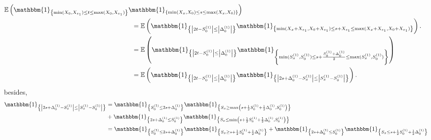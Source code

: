 \documentclass[12pt]{article}
\theoremstyle{Theorem}
\begin{document}
{\small
\begin{align*}
\mathbb{E}\left(\mathbbm{1}_{\left\{\min(X_{\scriptscriptstyle 0}, X_{e_1}) \leq t \leq \max(X_{\scriptscriptstyle 0}, X_{e_1})\right\}}\mathbbm{1}_{\left\{\min(X_{\scriptscriptstyle x}, X_{0}) \leq s \leq \max(X_{\scriptscriptstyle x}, X_{0}) \right\}}\right)\\
& \hspace{-6cm} = \mathbb{E}\left(\mathbbm{1}_{\left\{ \left|2t - S^{\scriptscriptstyle (1)}_{\scriptscriptstyle 0}\right| \leq \left|\Delta^{\scriptscriptstyle (1)}_{\scriptscriptstyle 0}\right|\right\}}\mathbbm{1}_{\left\{\min(X_{\scriptscriptstyle x}+ X_{e_1}, X_{0} + X_{e_1}) \leq s + X_{e_1}\leq \max(X_{\scriptscriptstyle x} + X_{e_1}, X_{0} + X_{e_1}) \right\}}\right). \\
& \hspace{-6cm} = \mathbb{E}\left(\mathbbm{1}_{\left\{ \left|2t - S^{\scriptscriptstyle (1)}_{\scriptscriptstyle 0}\right| \leq \left|\Delta^{\scriptscriptstyle (1)}_{\scriptscriptstyle 0}\right|\right\}}\mathbbm{1}_{\left\{\min(S^{(1)}_{x}, S^{(1)}_{0}) \leq s + \frac{S^{(1)}_{0} + \Delta^{(1)}_{0}}{2}\leq \max(S^{(1)}_{x}, S^{(1)}_{0}) \right\}}\right) \\
& \hspace{-6cm} = \mathbb{E}\left(\mathbbm{1}_{\left\{ \left|2t - S^{\scriptscriptstyle (1)}_{\scriptscriptstyle 0}\right| \leq \left|\Delta^{\scriptscriptstyle (1)}_{\scriptscriptstyle 0}\right|\right\}}\mathbbm{1}_{\left\{ \left|2s + \Delta^{(1)}_{0} -  S^{\scriptscriptstyle (1)}_{x}  \right| \leq \left|S^{\scriptscriptstyle (1)}_{x} - S^{\scriptscriptstyle (1)}_{0}\right|\right\}}\right). 
\end{align*}}
besides, 
\begin{align*}
\mathbbm{1}_{\left\{ \left|2s + \Delta^{(1)}_{0} -  S^{\scriptscriptstyle (1)}_{x}  \right| \leq \left|S^{\scriptscriptstyle (1)}_{x} - S^{\scriptscriptstyle (1)}_{0}\right|\right\}} &= \mathbbm{1}_{\left\{  S^{\scriptscriptstyle (1)}_{0} \leq 2s + \Delta^{(1)}_{0}\right\}} \mathbbm{1}_{\left\{ S_{x} \geq  \max\left(s+ \frac{1}{2}S^{\scriptscriptstyle (1)}_{0} + \frac{1}{2}\Delta^{\scriptscriptstyle (1)}_{0}, S^{\scriptscriptstyle (1)}_{0}\right) \right\}} \\
& + \mathbbm{1}_{\left\{  2s + \Delta^{(1)}_{0} \leq S^{\scriptscriptstyle (1)}_{0} \right\}} \mathbbm{1}_{\left\{ S_{x} \leq  \min\left(s+ \frac{1}{2}S^{\scriptscriptstyle (1)}_{0} + \frac{1}{2}\Delta^{\scriptscriptstyle (1)}_{0}, S^{\scriptscriptstyle (1)}_{0}\right) \right\}} \\
&= \mathbbm{1}_{\left\{  S^{\scriptscriptstyle (1)}_{0} \leq 2s + \Delta^{(1)}_{0}\right\}} \mathbbm{1}_{\left\{ S_{x} \geq s+ \frac{1}{2}S^{\scriptscriptstyle (1)}_{0} + \frac{1}{2}\Delta^{\scriptscriptstyle (1)}_{0}\right\}} + \mathbbm{1}_{\left\{  2s + \Delta^{(1)}_{0} \leq S^{\scriptscriptstyle (1)}_{0} \right\}} \mathbbm{1}_{\left\{ S_{x} \leq  s+ \frac{1}{2}S^{\scriptscriptstyle (1)}_{0} + \frac{1}{2}\Delta^{\scriptscriptstyle (1)}_{0} \right\}} \\
\end{align*} 
\end{document}
